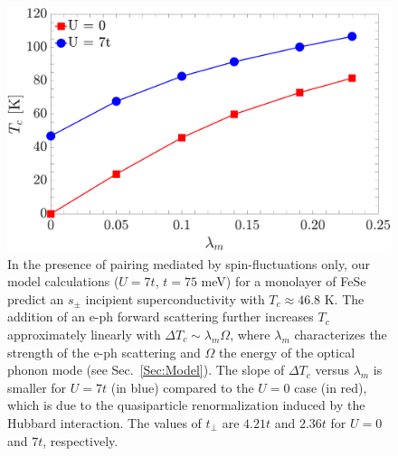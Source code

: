 \documentclass[%
 reprint,
 superscriptaddress,
nofootinbib,
nobibnotes,
 amsmath,amssymb,
 aps,
 prb,
 dvipsnames, 
 floatfix
]{revtex4-2}
\newcommand{\eph}{e-ph}
\begin{document}
\begin{figure}[t]
    \centering
    \includegraphics[width=\columnwidth]{figures/Figure1.pdf}
    \caption{
    In the presence of pairing mediated by spin-fluctuations only, our model calculations ($U=7t$, $t = 75$ meV) for a monolayer of FeSe predict an $s_\pm$ incipient superconductivity with $T_c \approx 46.8$ K. The 
    addition of an {\eph} forward scattering further increases $T_c$ approximately linearly with $\Delta T_c \sim \lambda_m \Omega$, where $\lambda_m$ characterizes the strength of the {\eph} scattering and $\Omega$ the energy of the optical phonon mode (see Sec.~\ref{Sec:Model}). The slope of $\Delta T_c$ versus $\lambda_m$ is smaller for $U=7t$ (in blue) 
    compared to the $U=0$ case (in red), which is due to the quasiparticle renormalization induced by the Hubbard interaction. The values of $t_\perp$ are $4.21t$ and $2.36t$ for $U = 0$ and $7t$, respectively.
    } 
    \label{fig:FigTcvslambda}
\end{figure}
\end{document}
